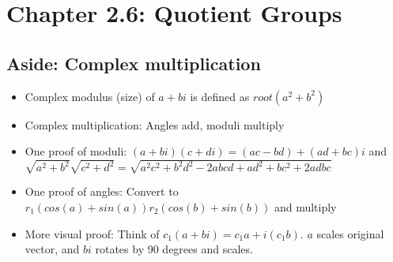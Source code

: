 \documentclass[11pt, oneside]{article}   	%
\begin{document}
\section {Chapter 2.6: Quotient Groups}
\subsection{Aside: Complex multiplication}
\begin{itemize}
\item Complex modulus (size) of $a+bi$ is defined as $root(a^2+b^2)$
\item Complex multiplication: Angles add, moduli multiply
\item One proof of moduli: $(a+bi)(c+di) = (ac - bd) + (ad+bc)i$
and $\sqrt{a^2+b^2}\sqrt{c^2+d^2} = \sqrt{a^2c^2 + b^2d^2 - 2abcd + ad^2+bc^2 + 2adbc}$
\item One proof of angles: Convert to $r_1(cos(a) + sin(a))r_2(cos(b)+sin(b))$ and multiply
\item More visual proof: Think of $c_1(a+bi) = c_1a + i(c_1b)$. $a$ scales original vector, and $bi$ rotates by 90 degrees and scales.
\end{itemize}
\end{document}
